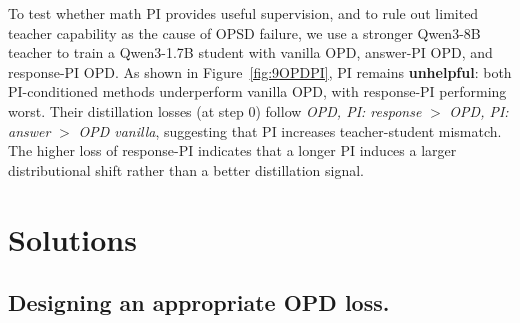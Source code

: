 To test whether math PI provides useful supervision, and to rule out limited
teacher capability as the cause of OPSD failure, we use a stronger Qwen3-8B
teacher to train a Qwen3-1.7B student with vanilla OPD, answer-PI OPD, and
response-PI OPD. As shown in Figure~\ref{fig:9OPDPI}, PI remains \textbf{unhelpful}:
both PI-conditioned methods underperform vanilla OPD, with response-PI
performing worst. Their distillation losses (at step 0) follow
\emph{OPD, PI: response} $>$ \emph{OPD, PI: answer} $>$ \emph{OPD vanilla},
suggesting that PI increases teacher-student mismatch. The higher loss of response-PI indicates that a longer PI induces a larger distributional
shift rather than a better distillation signal.


\section{Solutions}

\subsection{Designing an appropriate OPD loss.}


